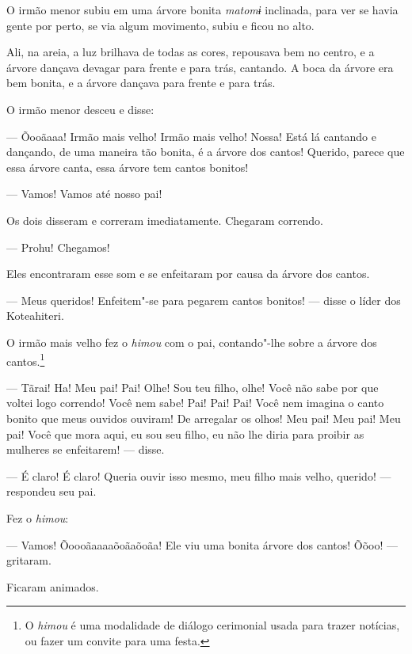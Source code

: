 O irmão menor subiu em uma árvore bonita \emph{matomɨ} inclinada, para
ver se havia gente por perto, se via algum movimento, subiu e ficou
no alto. 

Ali, na areia, a luz brilhava de todas as cores, repousava bem no
centro, e a árvore dançava devagar para frente e para trás, cantando. A boca da árvore era bem bonita, e a árvore dançava para frente e para
trás. 

O irmão menor desceu e disse:

--- Õooãaaa! Irmão mais velho! Irmão mais velho! Nossa! Está lá cantando
e dançando, de uma maneira tão bonita, é a árvore dos cantos! Querido,
parece que essa árvore canta, essa árvore tem cantos bonitos! 

--- Vamos! Vamos até nosso pai! 

Os dois disseram e correram imediatamente. Chegaram correndo.

--- Prohu! Chegamos! 

Eles encontraram esse som e se enfeitaram por causa da árvore dos cantos. 

--- Meus queridos! Enfeitem"-se para pegarem cantos bonitos! --- disse o
líder dos Koteahiteri. 

O irmão mais velho fez o \emph{himou} com o pai, contando"-lhe sobre a
árvore dos cantos.\footnote{  O \emph{himou} é uma modalidade de diálogo cerimonial usada para trazer notícias, ou fazer um convite para uma festa.}

--- Tãrai! Ha! Meu pai! Pai! Olhe! Sou teu filho, olhe! Você não sabe
por que voltei logo correndo! Você nem sabe! Pai! Pai! Pai! Você nem
imagina o canto bonito que meus ouvidos ouviram! De arregalar os olhos!
Meu pai! Meu pai! Meu pai! Você que mora aqui, eu sou seu filho, eu não
lhe diria para proibir as mulheres se enfeitarem! --- disse. 

--- É claro! É claro! Queria ouvir isso mesmo, meu filho mais velho,
querido! --- respondeu seu pai. 

Fez o \emph{himou}: 

--- Vamos! Õoooãaaaaõoãaõoãa! Ele viu uma bonita árvore dos cantos!
Õõoo! --- gritaram. 

Ficaram animados.

 

